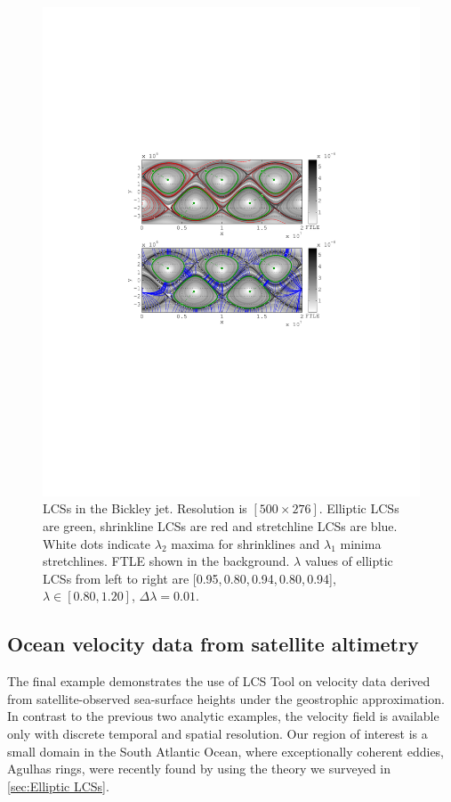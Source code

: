 \documentclass[5p]{elsarticle}
\begin{document}
\begin{figure}
\centering
\includegraphics[width=.475\textwidth]{graphics/bickley_jet/lambda_hyperbolic_lcs}
\caption{
LCSs in the Bickley jet.
Resolution is $[500 \times 276]$.
Elliptic LCSs are green, shrinkline LCSs are red and stretchline LCSs are blue. 
White dots indicate $\lambda_2$ maxima for shrinklines and $\lambda_1$ minima stretchlines.
FTLE shown in the background.
$\lambda$ values of elliptic LCSs from left to right are [0.95,\,0.80,\,0.94,\,0.80,\,0.94], $\lambda \in [0.80,1.20]$, $\Delta\lambda = 0.01$.
}
\label{f:Bickley jet LCS}
\end{figure}

\subsection{Ocean velocity data from satellite altimetry}
\label{sec:oceandataset}

The final example demonstrates the use of LCS Tool on velocity data derived from satellite-observed sea-surface heights under the geostrophic approximation. In contrast to the previous two analytic examples, the velocity field is available only with discrete temporal and spatial resolution. Our region of interest is a small domain in the South Atlantic Ocean, where exceptionally coherent eddies, Agulhas rings, were recently found by \citet{haller13:_coher_lagran,haller14:_adden_coher_lagran} using the theory we surveyed in \cref{sec:Elliptic LCSs}.
\end{document}
